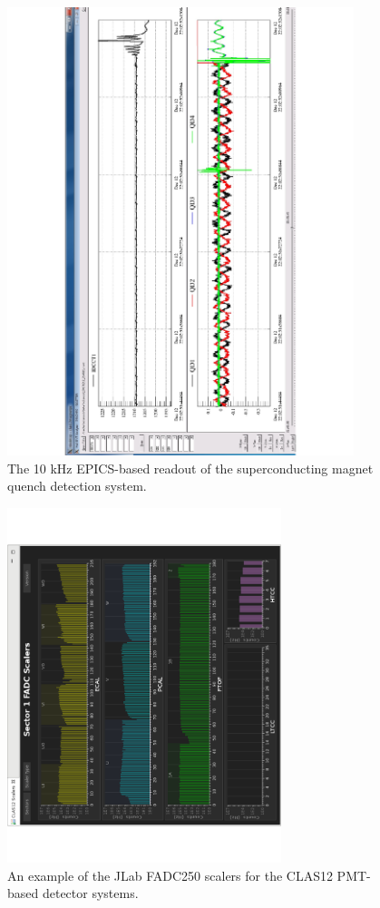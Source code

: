 \begin{figure}[t]\centering
	\includegraphics[width=0.9\textwidth]{img/tordaq}
	\caption{The 10 kHz EPICS-based readout of the superconducting magnet quench detection system.
	\label{fig:tordaq}}
\end{figure}

\begin{figure}[htbp]\centering
	\includegraphics[width=8cm]{img/fd-scalers}
	\caption{An example of the JLab FADC250 scalers for the CLAS12 PMT-based detector systems.
	\label{fig:jlabscalers}}
\end{figure}

